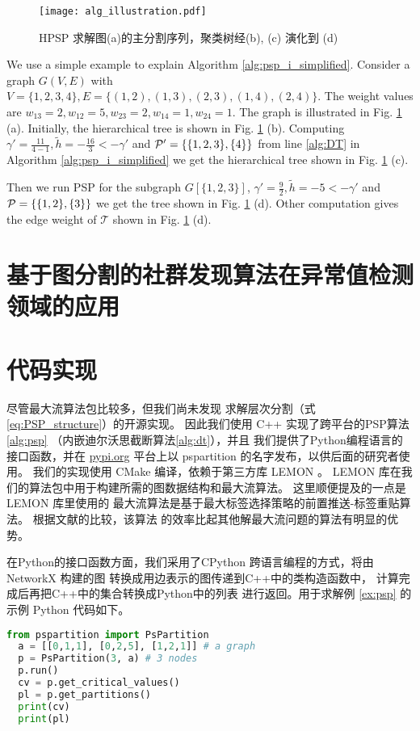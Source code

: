 \begin{figure}[!ht]
	\centering
	\texttt{[image: alg\_illustration.pdf]}
	\caption{HPSP 求解图(a)的主分割序列，聚类树经(b), (c) 演化到 (d) }\label{fig:alg_eg}
\end{figure}

\begin{example}
	We use a simple example to explain Algorithm \ref{alg:psp_i_simplified}. Consider a graph $G(V, E)$ with $V=\{1,2,3,4\}, E=\{(1,2),(1,3),(2,3),(1,4),(2,4)\}$. The weight values are $w_{13}=2, w_{12}=5, w_{23}=2, w_{14}=1, w_{24}=1$. The graph is illustrated
	in Fig. \ref{fig:alg_eg} (a). Initially, the hierarchical tree is shown in Fig. \ref{fig:alg_eg} (b). Computing $\gamma' = \frac{11}{4-1}, \tilde{h} = -\frac{16}{3} < -\gamma' $ and $\P' = \{\{1,2,3\},\{4\}\}$ from line \ref {alg:DT} in Algorithm \ref{alg:psp_i_simplified} we get the hierarchical tree shown in Fig. \ref{fig:alg_eg} (c).
	
	Then we run PSP for the subgraph $G[\{1,2,3\}]$, $\gamma' = \frac{9}{2}, \tilde{h} = -5 < -\gamma'$ and $\P= \{\{1,2\},\{3\}\}$ we get the tree shown in Fig. \ref{fig:alg_eg} (d). Other computation gives the edge weight of $\mathcal{T}$ shown in Fig. \ref{fig:alg_eg} (d).
\end{example}	
\section{基于图分割的社群发现算法在异常值检测领域的应用}

\section{代码实现}
尽管最大流算法包比较多，但我们尚未发现
求解层次分割（式\eqref{eq:PSP_structure}）的开源实现。
因此我们使用 C++ 实现了跨平台的PSP算法\ref{alg:psp}
（内嵌迪尔沃思截断算法\ref{alg:dt}），并且
我们提供了Python编程语言的接口函数，并在 \url{pypi.org}
平台上以 pspartition
的名字发布，以供后面的研究者使用。
我们的实现使用 CMake 编译，依赖于第三方库 LEMON \cite{dezsHo2011lemon}。 
LEMON 库在我们的算法包中用于构建所需的图数据结构和最大流算法。
这里顺便提及的一点是 LEMON 库里使用的
最大流算法是基于最大标签选择策略的前置推送-标签重贴算法。
根据文献\citet{ahuja1997computational}的比较，该算法
的效率比起其他解最大流问题的算法有明显的优势。

在Python的接口函数方面，我们采用了CPython
跨语言编程的方式，将由 NetworkX \cite{SciPyProceedings_11} 构建的图
转换成用边表示的图传递到C++中的类构造函数中，
计算完成后再把C++中的集合转换成Python中的列表
进行返回。用于求解例 \ref{ex:psp}
的示例 Python 代码如下。
\begin{lstlisting}[language=Python]
  from pspartition import PsPartition
  a = [[0,1,1], [0,2,5], [1,2,1]] # a graph
  p = PsPartition(3, a) # 3 nodes
  p.run()  
  cv = p.get_critical_values()
  pl = p.get_partitions()
  print(cv)
  print(pl)
  \end{lstlisting}
